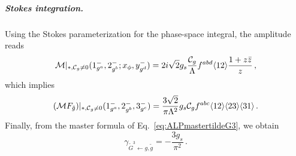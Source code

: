 \subparagraph{Stokes integration.}
Using the Stokes parameterization for the phase-space integral, the amplitude reads
\begin{equation}
    \mathcal{M}|_{*,\mathcal C_g \neq  0}(1^-_{g^a},2^-_{g^b};x_\phi,y^-_{g^d}) = 2i\sqrt{2}g_s \frac{\mathcal C_g}{\Lambda}f^{abd}\langle 1 2 \rangle\frac{1+z\bar z}{ z}\,,
\end{equation}
which implies
\begin{equation}
    (\mathcal M F_{\tilde g})|_{*,\mathcal C_g \neq  0}(1^-_{g^a},2^-_{g^b},3^-_{g^c}) =  \frac{3\sqrt{2}}{\pi\Lambda^2} g_s\mathcal  C_gf^{abc} \langle 1 2 \rangle\langle 2 3 \rangle \langle 3 1 \rangle\,.
\end{equation}
Finally, from the master formula of Eq.~\eqref{eq:ALPmastertildeG3}, we obtain
\begin{equation}
\label{eq:ALPgammatildeG3}
    \gamma_{\tilde G^3\leftarrow g,\tilde g} = -\frac{3g_s}{\pi^2}\,.
\end{equation}


